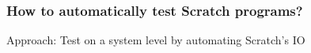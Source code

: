 \begin{frame}
\end{frame}

\begin{frame}\frametitle{How to automatically test Scratch programs?}
    Approach: Test on a system level by automating Scratch's IO




\end{frame}
